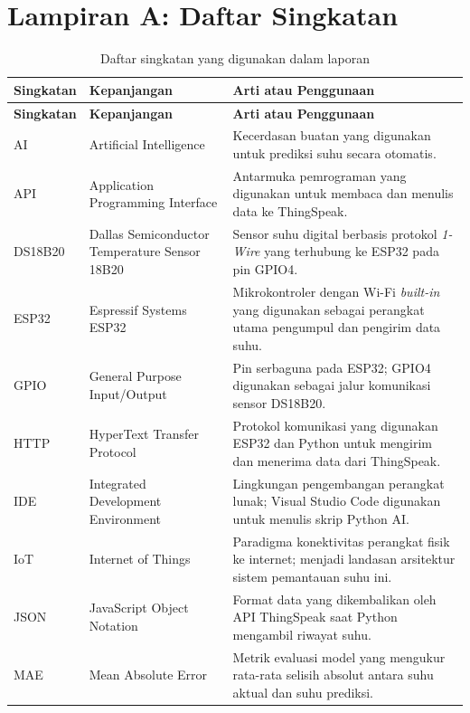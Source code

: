 \section*{Lampiran A: Daftar Singkatan}
{}

\begingroup
\setlength{\tabcolsep}{3pt}
\begin{longtable}{L{2.2cm} L{4.5cm} L{6.0cm}}
\caption{Daftar singkatan yang digunakan dalam laporan}
\label{tab:singkatan}\\
\toprule
\textbf{Singkatan} & \textbf{Kepanjangan} & \textbf{Arti atau Penggunaan}\\
\midrule
\endfirsthead
\toprule
\textbf{Singkatan} & \textbf{Kepanjangan} & \textbf{Arti atau Penggunaan}\\
\midrule
\endhead
AI      & Artificial Intelligence & Kecerdasan buatan yang digunakan untuk prediksi suhu secara otomatis.\\
API     & Application Programming Interface & Antarmuka pemrograman yang digunakan untuk membaca dan menulis data ke ThingSpeak.\\
DS18B20 & Dallas Semiconductor Temperature Sensor 18B20 & Sensor suhu digital berbasis protokol \textit{1-Wire} yang terhubung ke ESP32 pada pin GPIO4.\\
ESP32   & Espressif Systems ESP32 & Mikrokontroler dengan Wi-Fi \textit{built-in} yang digunakan sebagai perangkat utama pengumpul dan pengirim data suhu.\\
GPIO    & General Purpose Input/Output & Pin serbaguna pada ESP32; GPIO4 digunakan sebagai jalur komunikasi sensor DS18B20.\\
HTTP    & HyperText Transfer Protocol & Protokol komunikasi yang digunakan ESP32 dan Python untuk mengirim dan menerima data dari ThingSpeak.\\
IDE     & Integrated Development Environment & Lingkungan pengembangan perangkat lunak; Visual Studio Code digunakan untuk menulis skrip Python AI.\\
IoT     & Internet of Things & Paradigma konektivitas perangkat fisik ke internet; menjadi landasan arsitektur sistem pemantauan suhu ini.\\
JSON    & JavaScript Object Notation & Format data yang dikembalikan oleh API ThingSpeak saat Python mengambil riwayat suhu.\\
MAE     & Mean Absolute Error & Metrik evaluasi model yang mengukur rata-rata selisih absolut antara suhu aktual dan suhu prediksi.\\

\end{longtable}
